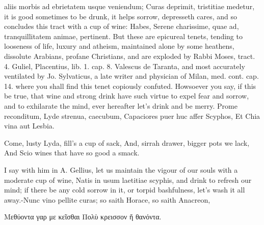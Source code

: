 aliis morbis ad ebrietatem usque veniendum; Curas deprimit, tristitiae
medetur, it is good sometimes to be drunk, it helps sorrow, depresseth
cares, and so concludes this tract with a cup of wine: Habes, Serene
charissime, quae ad, tranquillitatem animae, pertinent. But these are
epicureal tenets, tending to looseness of life, luxury and atheism,
maintained alone by some heathens, dissolute Arabians, profane
Christians, and are exploded by Rabbi Moses, tract. 4. Guliel,
Placentius, lib. 1. cap. 8. Valescus de Taranta, and most accurately
ventilated by Jo. Sylvaticus, a late writer and physician of Milan,
med. cont. cap. 14. where you shall find this tenet copiously confuted.
Howsoever you say, if this be true, that wine and strong drink have
such virtue to expel fear and sorrow, and to exhilarate the mind, ever
hereafter let's drink and be merry.
Prome reconditum, Lyde strenua, caecubum,
Capaciores puer huc affer Scyphos,
Et Chia vina aut Lesbia.

Come, lusty Lyda, fill's a cup of sack,
And, sirrah drawer, bigger pots we lack,
And Scio wines that have so good a smack.

I say with him in A. Gellius, let us maintain the vigour of our
souls with a moderate cup of wine, Natis in usum laetitiae
scyphis, and drink to refresh our mind; if there be any cold sorrow in
it, or torpid bashfulness, let's wash it all away.-Nunc vino pellite
curas; so saith Horace, so saith Anacreon,

\textgreek[variant=ancient]{Μεθύοντα γαρ με κεῖσθαι
Πολὺ κρεισσον ἤ θανόντα.}

